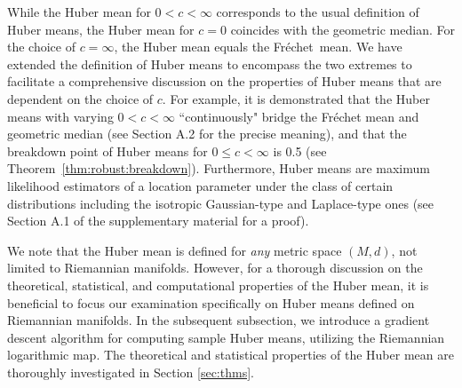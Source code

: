 \documentclass[preprint]{imsart}
\def\Frechet{Fr\'{e}chet}
\theoremstyle{plain}
\theoremstyle{remark}
\begin{document}
 
While the Huber mean for $0<c<\infty$ corresponds to the usual definition of Huber means, the Huber mean for $c = 0$ coincides with the geometric median. For the choice of $c = \infty$, the Huber mean equals the  \Frechet\ mean.  We have extended the definition of Huber means to encompass the two extremes to facilitate a comprehensive discussion on the properties of Huber means that are dependent on the choice of $c$. For example, it is demonstrated that the Huber means with varying $0 < c < \infty$ ``continuously" bridge the Fr\'{e}chet mean and geometric median (see Section A.2 for the precise meaning), and that the breakdown point of Huber means for $0 \le c < \infty$ is 0.5 (see Theorem~\ref{thm:robust:breakdown}). Furthermore, Huber means are maximum likelihood estimators of a location parameter under the class of certain distributions including the isotropic Gaussian-type and Laplace-type ones (see Section A.1 of the supplementary material for a proof).



We note that the Huber mean is defined for \textit{any} metric space $(M, d)$, not limited to Riemannian manifolds. However, for a thorough discussion on the theoretical, statistical, and computational properties of the Huber mean, it is beneficial to focus our examination specifically on Huber means defined on Riemannian manifolds. In the subsequent subsection, we introduce a gradient descent algorithm for computing sample Huber means, utilizing the Riemannian logarithmic map. The theoretical and statistical properties of the Huber mean are thoroughly investigated in Section \ref{sec:thms}. 





\end{document}
